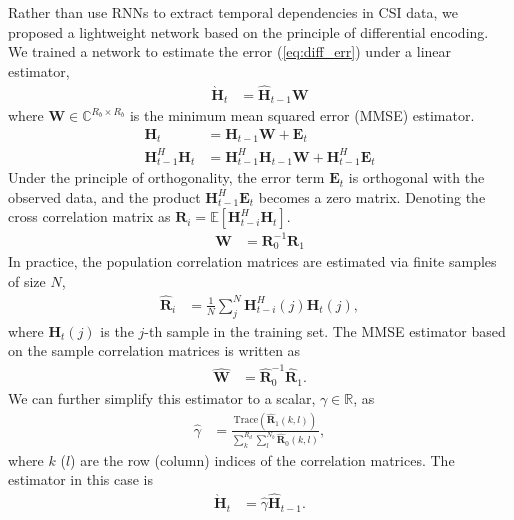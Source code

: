 Rather than use RNNs to extract temporal dependencies in CSI data, we proposed a lightweight network based on the principle of differential encoding. We trained a network to estimate the error (\ref{eq:diff_err}) under a linear estimator, 
\begin{align*}
	\grave{\mathbf H}_t &=  \hat{\mathbf H}_{t-1} \mathbf W
\end{align*}
where $\mathbf W \in \mathbb C^{R_b \times R_b}$ is the minimum mean squared error (MMSE) estimator.
\begin{align*}
	\mathbf H_t &= \mathbf H_{t-1}\mathbf W + \mathbf E_t \\
	\mathbf H_{t-1}^H\mathbf H_t &= \mathbf H_{t-1}^H\mathbf H_{t-1} \mathbf W + \mathbf H_{t-1}^H\mathbf E_t
\end{align*}
Under the principle of orthogonality, the error term $\mathbf E_t$ is orthogonal with the observed data, and the product $\mathbf H^H_{t-1}\mathbf E_t$ becomes a zero matrix. Denoting the cross correlation matrix as $\mathbf R_{i} = \mathbb{E}\left[\mathbf H_{t-i}^H\mathbf H_{t}\right]$.
\begin{align*}
	\mathbf W &= \mathbf R_0^{-1} \mathbf R_1 
\end{align*}
In practice, the population correlation matrices are estimated
via finite samples of size $N$,
\begin{align*}
	\mathbf{\hat R}_i &= \frac 1N \sum_{j}^N \mathbf H_{t-i}^H(j)\mathbf H_{t}(j),
\end{align*}
where $\mathbf H_t(j)$ is the $j$-th sample in the training set.
The MMSE estimator based on the sample correlation matrices is written as
\begin{align*}
	\hat{\mathbf W} &= \hat{\mathbf R}_0^{-1} \hat{\mathbf R}_1.
\end{align*}
We can further simplify this estimator to a scalar, $\gamma \in \mathbb R$, as
\begin{align*}
	\hat \gamma &= \frac{\text{Trace}(\hat{\mathbf R}_1(k,l))}{\sum_k^{R_d}\sum_l^{N_b}\hat{\mathbf R}_0(k,l)},
\end{align*}
where $k$ ($l$) are the row (column) indices of the correlation matrices. The estimator in this case is 
\begin{align}
	\grave{\mathbf H}_t &= \hat\gamma \hat{\mathbf H}_{t-1} \label{eq:gamma-estim}.
\end{align}
